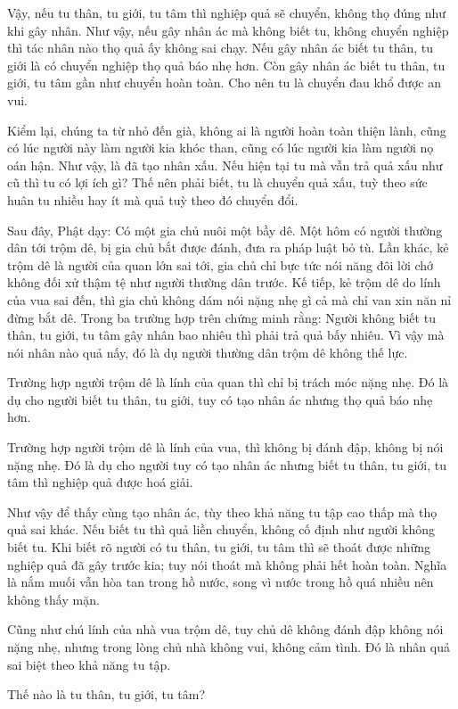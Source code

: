 \documentclass[
  12pt,
  oneside]{book}
\begin{document}
Vậy, nếu tu thân, tu giới, tu tâm thì nghiệp quả sẽ chuyển, không thọ đúng như khi gây nhân. Như vậy, nếu gây nhân ác mà không biết tu, không chuyển nghiệp thì tác nhân nào thọ quả ấy không sai chạy. Nếu gây nhân ác biết tu thân, tu giới là có chuyển nghiệp thọ quả báo nhẹ hơn. Còn gây nhân ác biết tu thân, tu giới, tu tâm gần như chuyển hoàn toàn. Cho nên tu là chuyển đau khổ được an vui.

Kiểm lại, chúng ta từ nhỏ đến già, không ai là người hoàn toàn thiện lành, cũng có lúc người này làm người kia khóc than, cũng có lúc người kia làm người nọ oán hận. Như vậy, là đã tạo nhân xấu. Nếu hiện tại tu mà vẫn trả quả xấu như cũ thì tu có lợi ích gì? Thế nên phải biết, tu là chuyển quả xấu, tuỳ theo sức huân tu nhiều hay ít mà quả tuỳ theo đó chuyển đổi.

Sau đây, Phật dạy: Có một gia chủ nuôi một bầy dê. Một hôm có người thường dân tới trộm dê, bị gia chủ bắt được đánh, đưa ra pháp luật bỏ tù. Lần khác, kẻ trộm dê là người của quan lớn sai tới, gia chủ chỉ bực tức nói năng đôi lời chớ không đối xử thậm tệ như người thường dân trước. Kế tiếp, kẻ trộm dê do lính của vua sai đến, thì gia chủ không dám nói nặng nhẹ gì cả mà chỉ van xin năn nỉ đừng bắt dê. Trong ba trường hợp trên chứng minh rằng: Người không biết tu thân, tu giới, tu tâm gây nhân bao nhiêu thì phải trả quả bấy nhiêu. Vì vậy mà nói nhân nào quả nấy, đó là dụ người thường dân trộm dê không thế lực.

Trường hợp người trộm dê là lính của quan thì chỉ bị trách móc nặng nhẹ. Đó là dụ cho người biết tu thân, tu giới, tuy có tạo nhân ác nhưng thọ quả báo nhẹ hơn.

Trường hợp người trộm dê là lính của vua, thì không bị đánh đập, không bị nói nặng nhẹ. Đó là dụ cho người tuy có tạo nhân ác nhưng biết tu thân, tu giới, tu tâm thì nghiệp quả được hoá giải.

Như vậy để thấy cùng tạo nhân ác, tùy theo khả năng tu tập cao thấp mà thọ quả sai khác. Nếu biết tu thì quả liền chuyển, không cố định như người không biết tu. Khi biết rõ người có tu thân, tu giới, tu tâm thì sẽ thoát được những nghiệp quả đã gây trước kia; tuy nói thoát mà không phải hết hoàn toàn. Nghĩa là nắm muối vẫn hòa tan trong hồ nước, song vì nước trong hồ quá nhiều nên không thấy mặn.

Cũng như chú lính của nhà vua trộm dê, tuy chủ dê không đánh đập không nói nặng nhẹ, nhưng trong lòng chủ nhà không vui, không cảm tình. Đó là nhân quả sai biệt theo khả năng tu tập.

Thế nào là tu thân, tu giới, tu tâm?
\end{document}

